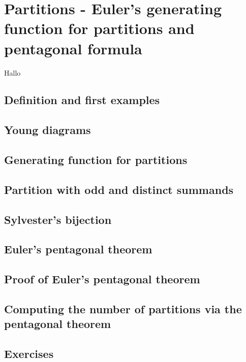 \section{Partitions - Euler's generating function for partitions and pentagonal formula}\label{partitions} 

Hallo

\subsection{Definition and first examples}

\subsection{Young diagrams}

\subsection{Generating function for partitions}

\subsection{Partition with odd and distinct summands}

\subsection{Sylvester's bijection}

\subsection{Euler's pentagonal theorem}

\subsection{Proof of Euler's pentagonal theorem}

\subsection{Computing the number of partitions via the pentagonal theorem}

\subsection{Exercises}